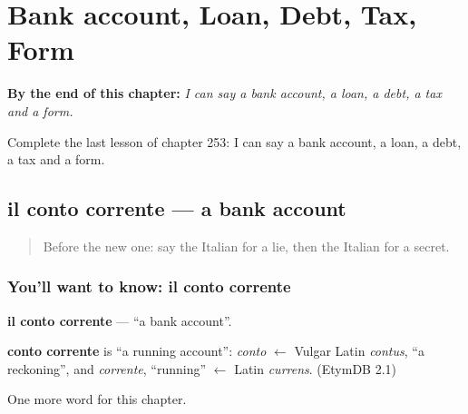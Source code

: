 
\chapter{Bank account, Loan, Debt, Tax, Form}
\label{ch:it-bank-account-loan-debt-tax-form}

\begin{chapteropening}
\textbf{By the end of this chapter:} \emph{I can say a bank account, a loan, a debt, a tax and a form.}

Complete the last lesson of chapter 253: I can say a bank account, a loan, a debt, a tax and a form.
\end{chapteropening}

\section[il conto corrente]{il conto corrente — a bank account}

\label{lesson:IT-C253-conto-corrente}



\begin{quote}
Before the new one: say the Italian for a lie, then the Italian for a secret.
\end{quote}

\subsection*{You'll want to know: il conto corrente}
\textbf{il conto corrente} — \textquotedblleft{}a bank account\textquotedblright{}.

\begin{cousinweb}
\textbf{conto corrente} is \textquotedblleft{}a running account\textquotedblright{}: \emph{conto} $\leftarrow$ Vulgar Latin \emph{contus}, \textquotedblleft{}a reckoning\textquotedblright{}, and \emph{corrente}, \textquotedblleft{}running\textquotedblright{} $\leftarrow$ Latin \emph{currens}. (EtymDB 2.1)
\end{cousinweb}

\begin{grammarlens}[title={What you've built}]
One more word for this chapter.
\end{grammarlens}


